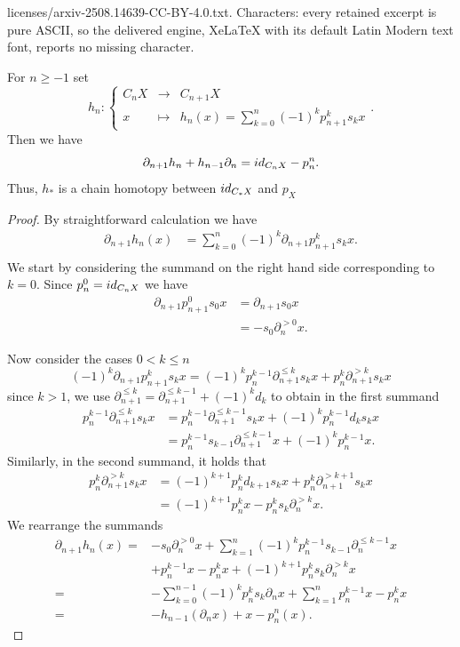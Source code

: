 \documentclass[10pt,a4paper]{amsart}
\newcommand{\argdel}[2]{\del^{#1}_{#2}}
\def\blt{*}
\newcommand{\del}{\partial}
\def\id{\textnormal{id}}
\newcommand{\pmap}[2]{p_{#2}^{#1}}
\begin{document}
licenses/arxiv-2508.14639-CC-BY-4.0.txt. Characters: every retained excerpt is pure ASCII, so the delivered engine, XeLaTeX with its default Latin Modern text font, reports no missing character.
\begin{proposition}\label{PropSimpChainHtpy}
    For $n \geq -1$ set
    $$h_n \colon \left\{ \begin{array}{ccc} C_nX & \rightarrow & 
    C_{n+1} X \\ x & \mapsto &h_n(x)=\displaystyle{\sum_{k=0}^n} (-1)^k\pmap{k}{n+1} s_k x\end{array} \right. . $$
    Then we have
    $$\partial_{n+1} h_{n} + h_{n-1}\partial_n = \id_{C_nX} - \pmap{n}{n}.$$
    Thus, $h_\blt$ is a chain homotopy between
    $\id_{C_\blt X}$ and $p_X$
\end{proposition}

\begin{proof}
By straightforward calculation we have
\begin{align*}
    \del_{n+1} h_n(x)&=\sum_{k=0}^n(-1)^k \del_{n+1} \pmap{k}{n+1} s_k x.\\
\end{align*}
We start by considering the summand on the right hand side corresponding to $k=0$. Since $\pmap{0}{n}=\id_{C_n X}$ we have
\begin{align*} \del_{n+1} \pmap{0}{n+1} s_0 x &=\del_{n+1} s_0 x \\
    &=-s_0\argdel{>0}{n} x.
\end{align*}

Now consider the cases $0<k\leq n$
\[
(-1)^k \del_{n+1} \pmap{k}{n+1} s_k x=(-1)^k \pmap{k-1}{n}\argdel{\leq k}{n+1}s_kx+\pmap{k}{n}\argdel{>k}{n+1}s_kx
\]
since $k>1$, we use $\argdel{\leq k}{n+1}=\argdel{\leq k-1}{n+1}+(-1)^kd_k$ to obtain in the first summand
\begin{align*}
    \pmap{k-1}{n}\argdel{\leq k}{n+1}s_kx&=\pmap{k-1}{n}\argdel{\leq k-1}{n+1}s_kx +(-1)^k\pmap{k-1}{n}d_{k}s_kx\\
    &=\pmap{k-1}{n}s_{k-1}\argdel{\leq k-1}{n+1}x +(-1)^k\pmap{k-1}{n}x.
\end{align*}
Similarly, in the second summand, it holds that
\begin{align*}
    \pmap{k}{n}\argdel{>k}{n+1}s_kx &=(-1)^{k+1}\pmap{k}{n}d_{k+1}s_kx+ \pmap{k}{n}\argdel{>k+1}{n+1}s_kx\\
    &=(-1)^{k+1}\pmap{k}{n}x-\pmap{k}{n}s_k\argdel{>k}{n}x.
\end{align*} 
We rearrange the summands
\begin{align*}
    \del_{n+1} h_n(x)= &-s_0\argdel{>0}{n}x+\sum_{k=1}^n(-1)^k\pmap{k-1}{n}s_{k-1}\argdel{\leq k-1}{n}x  \\ &+ \pmap{k-1}{n}x-\pmap{k}{n}x+ (-1)^{k+1}\pmap{k}{n}s_k\argdel{>k}{n}x\\
    =&-\sum_{k=0}^{n-1}(-1)^k \pmap{k}{n}s_k\del_n x+\sum_{k=1}^{n}\pmap{k-1}{n}x-\pmap{k}{n} x\\
    =&-h_{n-1}(\del_n x)+x-\pmap{n}{n}(x).
\end{align*}
\end{proof}
\end{document}
